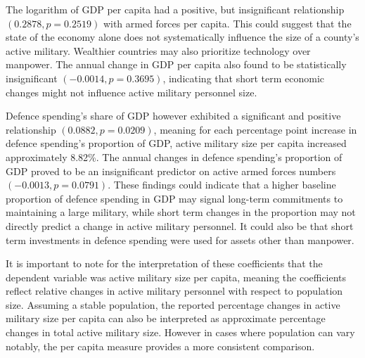 The logarithm of GDP per capita had a positive, but insignificant relationship $(0.2878, p=0.2519)$ 
with armed forces per capita. This could suggest that the state of the economy alone does not 
systematically influence the size of a county's active military. Wealthier countries may also
prioritize technology over manpower.
The annual change in GDP per capita also found to be 
statistically insignificant $(-0.0014, p=0.3695)$,
indicating that short term economic changes might not influence active military personnel size. 

Defence spending's share of GDP however exhibited 
a significant and positive relationship $(0.0882, p=0.0209)$, meaning for each percentage point increase in defence spending's 
proportion of GDP, active military size per capita increased approximately 8.82\%.
The annual changes in defence spending's proportion of GDP proved to be an insignificant predictor
on active armed forces numbers $(-0.0013, p=0.0791)$. 
These findings could indicate that a higher baseline proportion of defence 
spending in GDP may signal long-term commitments to maintaining a large military, while short term 
changes in the proportion may not directly predict a change in active military personnel. It could 
also be that short term investments in defence spending were used for assets other than manpower.

It is important to note for the interpretation of these coefficients that the dependent variable was 
active military size per capita, meaning the coefficients reflect relative changes in active military personnel 
with respect to population size. Assuming a stable population, the reported percentage changes 
in active military size per capita can also be interpreted as approximate percentage changes in total 
active military size. However in cases where population can vary notably, the per capita measure provides 
a more consistent comparison.

